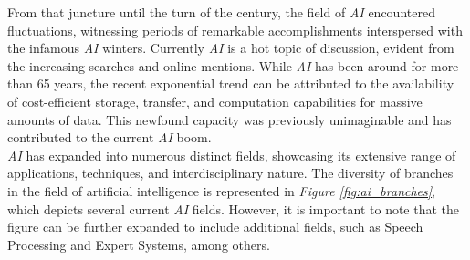 From that juncture until the turn of the century, the field of \textit{AI} encountered fluctuations, witnessing periods of remarkable accomplishments interspersed with the infamous \textit{AI} winters. Currently \textit{AI} is a hot topic of discussion, evident from the increasing searches and online mentions. While \textit{AI} has been around for more than 65 years, the recent exponential trend can be attributed to the availability of cost-efficient storage, transfer, and computation capabilities for massive amounts of data. This newfound capacity was previously unimaginable and has contributed to the current \textit{AI} boom. \\

\textit{AI} has expanded into numerous distinct fields, showcasing its extensive range of applications, techniques, and interdisciplinary nature. The diversity of branches in the field of artificial intelligence is represented in \textit{Figure \ref{fig:ai_branches}}, which depicts several current \textit{AI} fields. However, it is important to note that the figure can be further expanded to include additional fields, such as Speech Processing and Expert Systems, among others.


